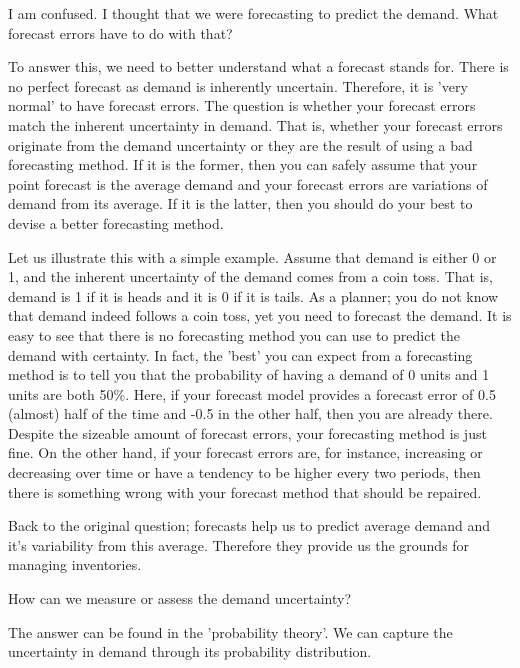 \begin{exercise}
I am confused. I thought that we were forecasting to predict the demand. What forecast errors have to do with that?


\begin{solution}
To answer this, we need to better understand what a forecast stands for. There is no perfect forecast as demand is inherently uncertain. Therefore, it is 'very normal' to have forecast errors. The question is whether your forecast errors match the inherent uncertainty in demand. That is, whether your forecast errors  originate from the demand uncertainty or they are the result of using a bad forecasting method. If it is the former, then you can safely assume that your point forecast is the average demand and your forecast errors are variations of demand from its average. If it is the latter, then you should do your best to devise a better forecasting method.

Let us illustrate this with a simple example. Assume that demand is either 0 or 1, and the inherent uncertainty of the demand comes from a coin toss. That is, demand is 1 if it is heads and it is 0 if it is tails. As a planner; you do not know that demand indeed follows a coin toss, yet you need to forecast the demand. It is easy to see that there is no forecasting method you can use to predict the demand with certainty. In fact, the 'best' you can expect from a forecasting method is to tell you that the probability of having a demand of 0 units and 1 units are both 50\%. Here, if your forecast model provides a forecast error of 0.5 (almost) half of the time and -0.5 in the other half, then you are already there. Despite the sizeable amount of forecast errors, your forecasting method is just fine. On the other hand, if your forecast errors are, for instance, increasing or decreasing over time or have a tendency to be higher every two periods, then there is something wrong with your forecast method that should be repaired.

Back to the original question; forecasts help us to predict average demand and it's variability from this average. Therefore they provide us the grounds for managing inventories. 
\end{solution}
\end{exercise}

\begin{exercise}
How can we measure or assess the demand uncertainty?


\begin{solution}
The answer can be found in the 'probability theory'. We can capture the uncertainty in demand through its probability distribution.
\end{solution}
\end{exercise}

